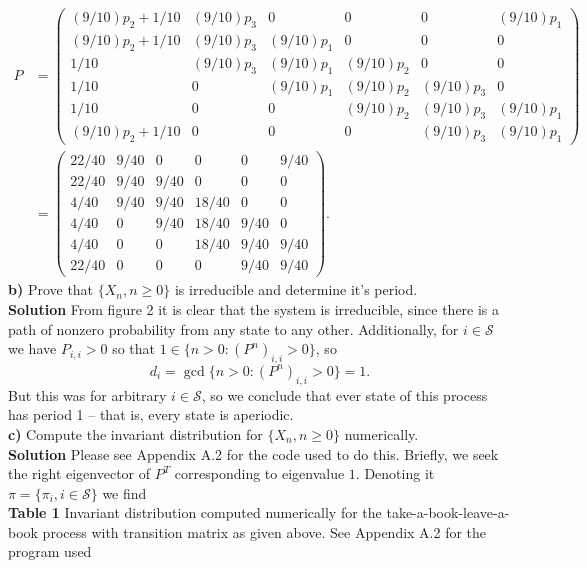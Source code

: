 \documentclass[11pt, letterpaper]{article}
\newcommand{\mc}[1]{\mathcal{#1}}
\begin{document}
    \begin{align*}
        P&=\begin{pmatrix}
            (9/10)p_2+1/10 & (9/10)p_3 & 0 & 0 & 0 & (9/10)p_1\\
            (9/10)p_2+1/10 & (9/10)p_3 & (9/10)p_1 & 0 & 0 & 0\\
            1/10 & (9/10)p_3 & (9/10)p_1 & (9/10)p_2 & 0 & 0\\
            1/10 & 0 & (9/10)p_1 & (9/10)p_2 & (9/10)p_3 & 0\\
            1/ 10 & 0 & 0 & (9/10)p_2 & (9/10)p_3 & (9/10)p_1\\
            (9/10)p_2+1/10 & 0 & 0 & 0 & (9/10)p_3 & (9/10)p_1
        \end{pmatrix}\\
        &=\begin{pmatrix}
            22/40 & 9/40 & 0 & 0 & 0 & 9/40\\
            22/40 & 9/40 & 9/40 & 0 & 0 & 0\\
            4/40 & 9/40 & 9/40 & 18/40 & 0 & 0\\
            4/40 & 0 & 9/40 & 18/40 & 9/40 & 0\\
            4/40 & 0 & 0 & 18/40 & 9/40 & 9/40\\
            22/40 & 0 & 0 & 0 & 9/40 & 9/40
        \end{pmatrix}.\tag*{$\qed$}
    \end{align*}
    {\bf b)} Prove that $\{X_n,n\geq 0\}$ is irreducible and determine it's period.\\[10pt]
    {\bf Solution} From figure 2 it is clear that the system is irreducible, since there is a path of nonzero probability from any state to any other. Additionally, for $i\in\mc{S}$ we have
    $P_{i,i}>0$ so that $1\in\{n>0:(P^n)_{i,i}>0\}$, so
    \[d_i=\gcd\{n>0:(P^n)_{i,i}>0\}=1.\]
    But this was for arbitrary $i\in\mc{S}$, so we conclude that ever state of this process has period 1 -- that is, every state is aperiodic.\\[10pt]
    {\bf c)} Compute the invariant distribution for $\{X_n,n\geq 0\}$ numerically.\\[10pt]
    {\bf Solution} Please see Appendix A.2 for the code used to do this. Briefly, we seek the right eigenvector of $P^T$ corresponding to eigenvalue $1$. Denoting it $\pi=\{\pi_i,i\in\mc{S}\}$ we find\\[10pt]
    {\bf Table 1} Invariant distribution computed numerically for the take-a-book-leave-a-book process with transition matrix as given above. See Appendix A.2 for the program used
\end{document}
